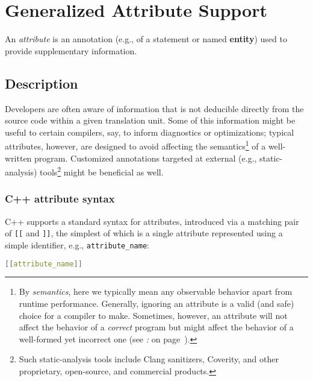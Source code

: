 \newpage
\section[Attribute Syntax]{Generalized Attribute Support}\label{attributes}



An \emph{attribute} is an annotation (e.g., of a statement or named
\textbf{entity}) used to provide supplementary information.

\subsection[Description]{Description}\label{description}

Developers are often aware of information that is not deducible directly
from the source code within a given translation unit. Some of this
information might be useful to certain compilers, say, to inform
diagnostics or optimizations; typical attributes, however, are designed
to avoid affecting the semantics{\cprotect\footnote{By \emph{semantics}, here
we typically mean any observable behavior apart from runtime
performance. Generally, ignoring an attribute is a valid (and safe)
choice for a compiler to make. Sometimes, however, an
attribute will not affect the behavior of a \emph{correct} program but might affect the behavior of a well-formed yet incorrect one (see
  {\it{}:} {\it{}} on page~\pageref{delineating-explicit-assumptions-in-code-to-achieve-better-optimizations}).}} of a
well-written program. Customized annotations targeted at external (e.g.,
static-analysis) tools{\cprotect\footnote{Such static-analysis tools include Clang sanitizers, Coverity, and other
  proprietary, open-source, and commercial products.}} might be
beneficial as well.

\subsubsection[C++ attribute syntax]{C++ attribute syntax}\label{c++-attribute-syntax}

C++ supports a standard syntax for attributes, introduced via a matching
pair of \texttt{[[} and \texttt{]]}, the simplest of which is a single
attribute represented using a simple identifier, e.g.,
\texttt{attribute\_name}:

\begin{lstlisting}[language=C++]
[[attribute_name]]
\end{lstlisting}

